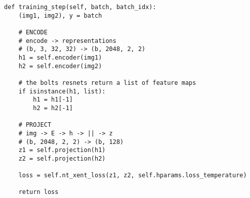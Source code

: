 \documentclass{article}
\begin{document}
\begin{lstlisting}
def training_step(self, batch, batch_idx):
    (img1, img2), y = batch

    # ENCODE
    # encode -> representations
    # (b, 3, 32, 32) -> (b, 2048, 2, 2)
    h1 = self.encoder(img1)
    h2 = self.encoder(img2)

    # the bolts resnets return a list of feature maps
    if isinstance(h1, list):
        h1 = h1[-1]
        h2 = h2[-1]

    # PROJECT
    # img -> E -> h -> || -> z
    # (b, 2048, 2, 2) -> (b, 128)
    z1 = self.projection(h1)
    z2 = self.projection(h2)

    loss = self.nt_xent_loss(z1, z2, self.hparams.loss_temperature)

    return loss
\end{lstlisting}
\end{document}

